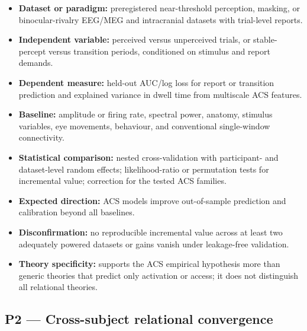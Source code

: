 \documentclass[
  11pt,
  a4paper,
]{article}
\providecommand{\tightlist}{%
  \setlength{\itemsep}{0pt}\setlength{\parskip}{0pt}}
\begin{document}
\begin{itemize}
\tightlist
\item
  \textbf{Dataset or paradigm:} preregistered near-threshold perception,
  masking, or binocular-rivalry EEG/MEG and intracranial datasets with
  trial-level reports.
\item
  \textbf{Independent variable:} perceived versus unperceived trials, or
  stable-percept versus transition periods, conditioned on stimulus and
  report demands.
\item
  \textbf{Dependent measure:} held-out AUC/log loss for report or
  transition prediction and explained variance in dwell time from
  multiscale ACS features.
\item
  \textbf{Baseline:} amplitude or firing rate, spectral power, anatomy,
  stimulus variables, eye movements, behaviour, and conventional
  single-window connectivity.
\item
  \textbf{Statistical comparison:} nested cross-validation with
  participant- and dataset-level random effects; likelihood-ratio or
  permutation tests for incremental value; correction for the tested ACS
  families.
\item
  \textbf{Expected direction:} ACS models improve out-of-sample
  prediction and calibration beyond all baselines.
\item
  \textbf{Disconfirmation:} no reproducible incremental value across at
  least two adequately powered datasets or gains vanish under
  leakage-free validation.
\item
  \textbf{Theory specificity:} supports the ACS empirical hypothesis
  more than generic theories that predict only activation or access; it
  does not distinguish all relational theories.
\end{itemize}

\subsection{P2 --- Cross-subject relational
convergence}\label{p2-cross-subject-relational-convergence}
\end{document}
